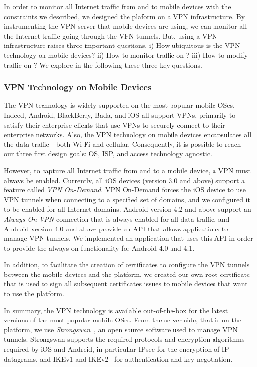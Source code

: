 In order to monitor all Internet traffic from and to mobile devices
with the constraints we described, we designed the \platname{} plaform
on a VPN infrastructure. By instrumenting the VPN server that
mobile devices are using, we can monitor all the Internet traffic going
through the VPN tunnels. But, using a VPN infrastructure raises three
important questions. i) How ubiquitous is the VPN technology on mobile
devices?  ii) How to monitor traffic on \platname{}? iii) How to
modify traffic on \platname? We explore in the following these three key questions.

\subsubsection{VPN Technology on Mobile Devices}
\label{sec:vpn-tech-mobile-device}
The VPN technology is widely supported on the most popular mobile
OSes. Indeed, Android, BlackBerry, Bada, and iOS all support VPNs,
primarily to satisfy their enterprise clients that use VPNs to
securely connect to their enterprise networks. Also, the VPN
technology on mobile devices encapsulates all the data traffic---both
Wi-Fi and cellular. Consequently, it is possible to reach our three
first design goals: OS, ISP, and access technology agnostic.

However, to capture all Internet traffic from and to a mobile device,
a VPN must always be enabled. Currently, all iOS devices (version 3.0
and above) support a feature called \textit{VPN On-Demand}.  VPN
On-Demand forces the iOS device to use VPN tunnels when connecting to
a specified set of domains, and we configured it to be enabled for all
Internet domains. Android version 4.2 and above support an
\textit{Always On VPN} connection that is always enabled for all data
traffic, and Android version 4.0 and above provide an API that allows
applications to manage VPN tunnels. We implemented an application that
uses this API in order to provide the always on functionality for
Android 4.0 and 4.1.

In addition, to facilitate the creation of certificates to configure
the VPN tunnels between the mobile devices and the \platname{}
platform, we created our own \platname{} root certificate that is used
to sign all subsequent certificates issues to mobile devices that want
to use the \platname{} platform. 

In summary, the VPN technology is available out-of-the-box for the
latest versions of the most popular mobile OSes. From the server side,
that is on the \platname{} platform, we use
\textit{Strongswan}~\cite{strongswan}, an open source software used to
manage VPN tunnels. Strongswan supports the required protocols and
encryption algorithms required by iOS and Android, in particullar
IPsec for the encryption of IP datagrams, and IKEv1 and
IKEv2~\cite{rfc5996} for authentication and key negotiation.


